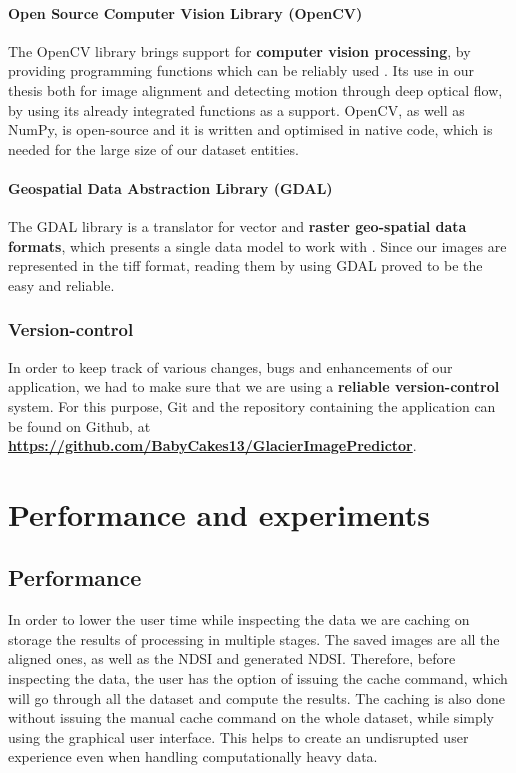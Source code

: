 \documentclass[12pt, a4paper]{report}
\begin{document}
	\subsubsection{Open Source Computer Vision Library (OpenCV)}
	
	\par The OpenCV library brings support for \textbf{computer vision processing}, by providing programming functions which can be reliably used \cite{cuda}. Its use in our thesis both for image alignment and detecting motion through deep optical flow, by using its already integrated functions as a support. OpenCV, as well as NumPy, is open-source and it is written and optimised in native code, which is needed for the large size of our dataset entities.
	
	\subsubsection{Geospatial Data Abstraction Library (GDAL)}
	
	\par The GDAL library is a translator for vector and \textbf{raster geo-spatial data formats}, which presents a single data model to work with \cite{gdal}. Since our images are represented in the tiff format, reading them by using GDAL proved to be the easy and reliable.
	
	\subsection{Version-control}
	\label{seq:versioning}
	
	\par In order to keep track of various changes, bugs and enhancements of our application, we had to make sure that we are using a \textbf{reliable version-control} system. For this purpose, Git and the repository containing the application can be found on Github, at \textbf{\url{https://github.com/BabyCakes13/GlacierImagePredictor}}.
	
	\newpage{}
	\chapter{Performance and experiments}

	
	\section{Performance}
	\label{seq:performance}
	
	\par In order to lower the user time while inspecting the data we are caching on storage the results of processing in multiple stages. The saved images are all the aligned ones, as well as the NDSI and generated NDSI. Therefore, before inspecting the data, the user has the option of issuing the cache command, which will go through all the dataset and compute the results. The caching is also done without issuing the manual cache command on the whole dataset, while simply using the graphical user interface. This helps to create an undisrupted user experience even when handling computationally heavy data.
	
\end{document}
